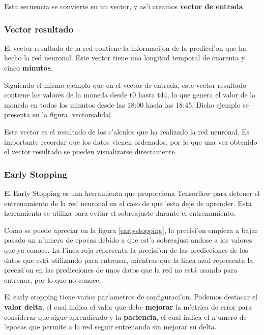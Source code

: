 Esta secuencia se convierte en un vector, y as'i creamos \textbf{vector de entrada}. 


\subsubsection*{Vector resultado}
El vector resultado de la red contiene la informaci'on de la predicci'on que ha hecho la red neuronal. Este vector tiene una longitud temporal de cuarenta y cinco \textbf{minutos}.


Siguiendo el mismo ejemplo que en el vector de entrada, este vector resultado contiene los valores de la moneda desde t0 hasta t44, lo que genera el valor de la moneda en todos los minutos desde las 18:00 hasta las 18:45. 
Dicho ejemplo se presenta en la figura \ref{vectorsalida}.

\clearpage


Este vector es el resultado de los c'alculos que ha realizado la red neuronal. Es importante recordar que los datos vienen ordenados, por lo que una vez obtenido el vector resultado se pueden visualizarse directamente. 



\subsubsection*{Early Stopping}
El Early Stopping es una herramienta que proporciona Tensorflow para detener el entrenamiento de la red neuronal en el caso de que 'esta deje de aprender. Esta herramienta se utiliza para evitar el sobreajuste durante el entrenamiento.


Como se puede apreciar en la figura \ref{earlystopping}, la precisi'on empieza a bajar pasado un n'umero de epocas debido a que est'a sobreajust'andose a los valores que ya conoce. La l'inea roja representa la precisi'on de las predicciones de los datos que está utilizando para entrenar, mientras que la linea azul representa la precisi'on en las predicciones de unos datos que la red no está usando para entrenar, por lo que no conoce.  

El early stopping tiene varios par'ametros de configuraci'on. Podemos destacar el \textbf{valor delta}, el cual indica el valor que debe \textbf{mejorar} la m'etrica de error para considerar que sigue aprendiendo y la \textbf{paciencia}, el cual indica el n'umero de 'epocas que permite a la red seguir entrenando sin mejorar su delta. 

